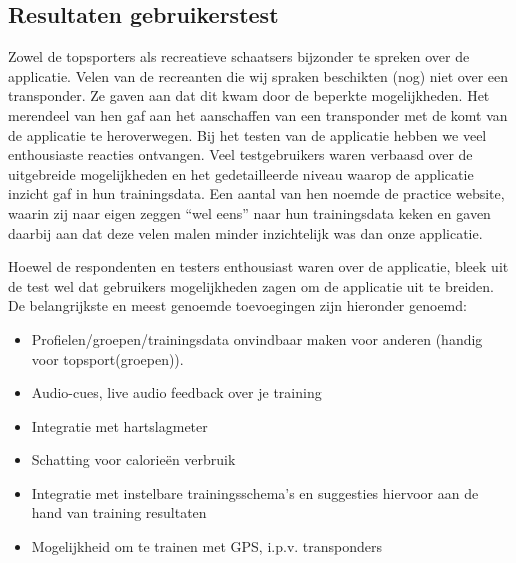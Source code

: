 \subsection{Resultaten gebruikerstest}
Zowel de topsporters als recreatieve schaatsers bijzonder te spreken over de applicatie. Velen van de recreanten die wij spraken beschikten (nog) niet over een transponder. Ze gaven aan dat dit kwam door de beperkte mogelijkheden. Het merendeel van hen gaf aan het aanschaffen van een transponder met de komt van de applicatie te heroverwegen. Bij het testen van de applicatie hebben we veel enthousiaste reacties ontvangen. Veel testgebruikers waren verbaasd over de uitgebreide mogelijkheden en het gedetailleerde niveau waarop de applicatie inzicht gaf in hun trainingsdata. Een aantal van hen noemde de \mylaps practice website, waarin zij naar eigen zeggen ``wel eens'' naar hun trainingsdata keken en gaven daarbij aan dat deze velen malen minder inzichtelijk was dan onze applicatie.

Hoewel de respondenten en testers enthousiast waren over de applicatie, bleek uit de test wel dat gebruikers mogelijkheden zagen om de applicatie uit te breiden. De belangrijkste en meest genoemde toevoegingen zijn hieronder genoemd:
\begin{itemize}
\item Profielen/groepen/trainingsdata onvindbaar maken voor anderen (handig voor topsport(groepen)).
\item Audio-cues, live audio feedback over je training 
\item Integratie met hartslagmeter
\item Schatting voor calorieën verbruik
\item Integratie met instelbare trainingsschema's en suggesties hiervoor aan de hand van training resultaten
\item Mogelijkheid om te trainen met GPS, i.p.v. transponders
\end{itemize}